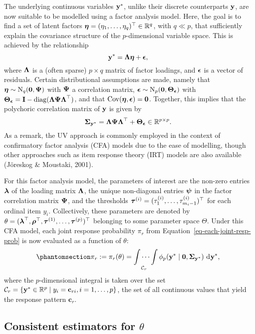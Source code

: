 \documentclass[
  letterpaper,
  DIV=11,
  numbers=noendperiod]{scrartcl}
\begin{document}
The underlying continuous variables \({\mathbf y}^*\), unlike their discrete
counterparts \({\mathbf y}\), are now suitable to be modelled using a factor
analysis model. Here, the goal is to find a set of latent factors
\({\boldsymbol\eta} = (\eta_1,\dots,\eta_q)^\top \in \mathbb{R}^q\), with \(q \ll p\),
that sufficiently explain the covariance structure of the
\(p\)-dimensional variable space. This is achieved by the relationship
\[
{\mathbf y}^* = {\boldsymbol\Lambda} {\boldsymbol\eta} + {\boldsymbol\epsilon},
\] where \({\boldsymbol\Lambda}\) is a (often sparse) \(p \times q\) matrix of
factor loadings, and \({\boldsymbol\epsilon}\) is a vector of residuals. Certain
distributional assumptions are made, namely that
\({\boldsymbol\eta} \sim \operatorname{N}_q({\mathbf 0},{\boldsymbol\Psi})\) with \({\boldsymbol\Psi}\) a correlation matrix,
\({\boldsymbol\epsilon} \sim \operatorname{N}_p({\mathbf 0},{\boldsymbol\Theta}_{{\boldsymbol\epsilon}})\) with
\({\boldsymbol\Theta}_{{\boldsymbol\epsilon}} = {\mathbf I} - \operatorname{diag}({\boldsymbol\Lambda} {\boldsymbol\Psi} {\boldsymbol\Lambda}^\top)\), and
that \(\operatorname{Cov}({\boldsymbol\eta},{\boldsymbol\epsilon}) = {\mathbf 0}\). Together, this implies that
the polychoric correlation matrix of \({\mathbf y}\) is given by \[
{\boldsymbol\Sigma}_{{\mathbf y}^*} = {\boldsymbol\Lambda} {\boldsymbol\Psi} {\boldsymbol\Lambda}^\top + {\boldsymbol\Theta}_{{\boldsymbol\epsilon}} \in \mathbb{R}^{p\times p}.
\] As a remark, the UV approach is commonly employed in the context of
confirmatory factor analysis (CFA) models due to the ease of modelling,
though other approaches such as item response theory (IRT) models are
also available (Jöreskog \& Moustaki, 2001).

For this factor analysis model, the parameters of interest are the
non-zero entries \({\boldsymbol\lambda}\) of the loading matrix \({\boldsymbol\Lambda}\), the
unique non-diagonal entries \({\boldsymbol\psi}\) in the factor correlation matrix
\({\boldsymbol\Psi}\), and the thresholds
\({\boldsymbol\tau}^{(i)} = (\tau_1^{(i)},\dots,\tau_{m_i-1}^{(i)})^\top\) for each
ordinal item \(y_i\). Collectively, these parameters are denoted by
\(\theta = ({\boldsymbol\lambda}^\top,{\boldsymbol\rho}^\top,{\boldsymbol\tau}^{(1)},\dots,{\boldsymbol\tau}^{(p)})^\top\)
belonging to some parameter space \(\Theta\). Under this CFA model, each
joint response probability \(\pi_r\) from
Equation~\ref{eq-each-joint-resp-prob} is now evaluated as a function of
\(\theta\):
\begin{equation}\phantomsection\label{eq-joint-resp-prob-integral}{
\pi_r := \pi_r(\theta) = \idotsint \limits_{\mathcal C_r} \phi_p(\by^* \mid \bzero,\bSigma_{\by^*}) \, \dint\by^*,
}\end{equation} where the \(p\)-dimensional integral is taken over the
set
\(\mathcal C_r = \{ {\mathbf y}^* \in \mathbb{R}^p \mid y_i = \mathbf c_{ri}, i=1,\dots,p\}\),
the set of all continuous values that yield the response pattern
\(\mathbf c_r\).

\subsection{\texorpdfstring{Consistent estimators for
\(\theta\)}{Consistent estimators for \textbackslash theta}}\label{consistent-estimators-for-theta}
\end{document}

